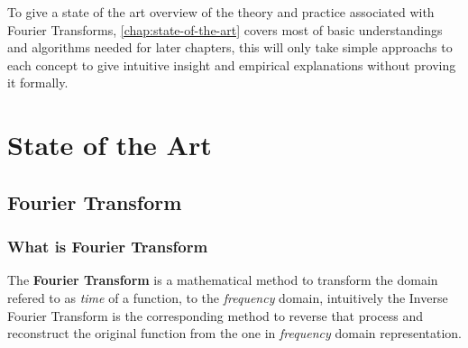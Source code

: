 \documentclass[
  oneside,
  11pt, a4paper,
  footinclude=true,
  headinclude=true,
  cleardoublepage=empty
]{scrbook}
\begin{document}
To give a state of the art overview of the theory and practice associated with Fourier Transforms, \autoref{chap:state-of-the-art} covers most of basic understandings and algorithms needed for later chapters, this will only take simple approachs to each concept to give intuitive insight and empirical explanations without proving it formally.





\chapter{State of the Art} \label{chap:state-of-the-art}

\section{Fourier Transform} \label{sec:fourier-transform}

\subsection{What is Fourier Transform} \label{subsec:what-is-fourier-transform}

The \textbf{Fourier Transform} is a mathematical method to transform the domain refered to as \textit{time} of a function, to the \textit{frequency} domain, intuitively the Inverse Fourier Transform is the corresponding method to reverse that process and reconstruct the original function from the one in \textit{frequency} domain representation.
\end{document}
